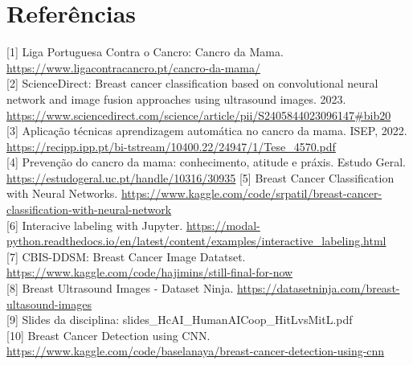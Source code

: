 \documentclass[10pt]{article}
\begin{document}
\section*{Referências}
[1] Liga Portuguesa Contra o Cancro: Cancro da Mama. \href{https://www.ligacontracancro.pt/cancro-da-mama/}{https://www.ligacontracancro.pt/cancro-da-mama/}\\[0pt]
[2] ScienceDirect: Breast cancer classification based on convolutional neural network and image fusion approaches using ultrasound images. 2023. \href{https://www.sciencedirect.com/science/article/pii/S2405844023096147#bib20}{https://www.sciencedirect.com/science/article/pii/S2405844023096147\#bib20}\\[0pt]
[3] Aplicação técnicas aprendizagem automática no cancro da mama. ISEP, 2022.\\
\href{https://recipp.ipp.pt/bi-tstream/10400.22/24947/1/Tese_4570.pdf}{https://recipp.ipp.pt/bi-tstream/10400.22/24947/1/Tese\_4570.pdf}\\[0pt]
[4] Prevenção do cancro da mama: conhecimento, atitude e práxis. Estudo Geral.\\
\href{https://estudogeral.uc.pt/handle/10316/30935}{https://estudogeral.uc.pt/handle/10316/30935} [5] Breast Cancer Classification with Neural Networks. \href{https://www.kaggle.com/code/srpatil/breast-cancer-classification-with-neural-network}{https://www.kaggle.com/code/srpatil/breast-cancer-classification-with-neural-network}\\[0pt]
[6] Interacive labeling with Jupyter. \href{https://modal-python.readthedocs.io/en/latest/content/examples/interactive_labeling.html}{https://modal-python.readthedocs.io/en/latest/content/examples/interactive\_labeling.html}\\[0pt]
[7] CBIS-DDSM: Breast Cancer Image Datatset. \href{https://www.kaggle.com/code/hajimins/still-final-for-now}{https://www.kaggle.com/code/hajimins/still-final-for-now}\\[0pt]
[8] Breast Ultrasound Images - Dataset Ninja. \href{https://datasetninja.com/breast-ultasound-images}{https://datasetninja.com/breast-ultasound-images}\\[0pt]
[9] Slides da disciplina: slides\_HcAI\_HumanAICoop\_HitLvsMitL.pdf\\[0pt]
[10] Breast Cancer Detection using CNN. \href{https://www.kaggle.com/code/baselanaya/breast-cancer-detection-using-cnn}{https://www.kaggle.com/code/baselanaya/breast-cancer-detection-using-cnn}
\end{document}

